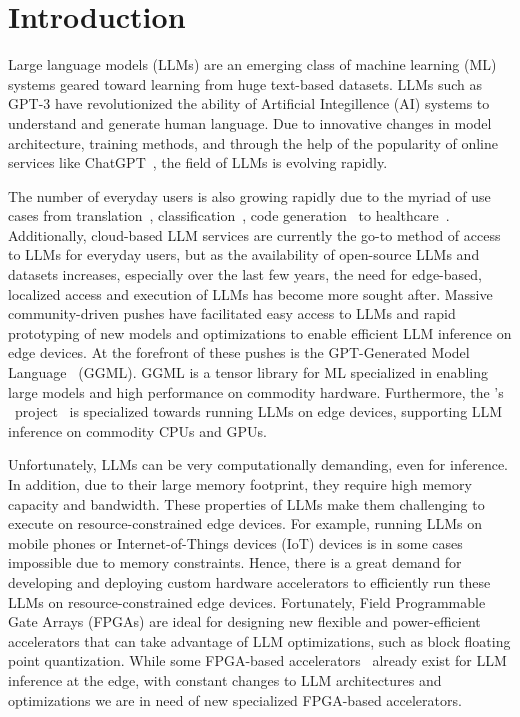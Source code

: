 
\section{Introduction}

Large language models (LLMs) are an emerging class of machine learning (ML) systems geared toward learning from huge text-based datasets.
LLMs such as GPT-3\cite{brownLanguageModelsAre2020} have revolutionized the ability of Artificial Integillence (AI) systems to understand and generate human language.
Due to innovative changes in model architecture, training methods, and through the help of the popularity of online services like ChatGPT~\cite{rayChatGPTComprehensiveReview2023}, the field of LLMs is evolving rapidly.

The number of everyday users is also growing rapidly due to the myriad of use cases from translation~\cite{yaoBenchmarkingLLMbasedMachine2024}, classification~\cite{sunTextClassificationLarge2023}, code generation~\cite{liuYourCodeGenerated2023} to healthcare~\cite{clusmannFutureLandscapeLarge2023}.
Additionally, cloud-based LLM services are currently the go-to method of access to LLMs for everyday users, but as the availability of open-source LLMs and datasets increases, especially over the last few years, the need for edge-based, localized access and execution of LLMs has become more sought after.
Massive community-driven pushes have facilitated easy access to LLMs and rapid prototyping of new models and optimizations to enable efficient LLM inference on edge devices.
At the forefront of these pushes is the GPT-Generated Model Language~\cite{GGML} (GGML).
GGML is a tensor library for ML specialized in enabling large models and high performance on commodity hardware.
Furthermore, the \GGML's \LPP~project~\cite{LLP} is specialized towards running LLMs on edge devices, supporting LLM inference on commodity CPUs and GPUs.

Unfortunately, LLMs can be very computationally demanding, even for inference.
In addition, due to their large memory footprint, they require high memory capacity and bandwidth.
These properties of LLMs make them challenging to execute on resource-constrained edge devices.
For example, running LLMs on mobile phones or Internet-of-Things devices (IoT) devices is in some cases impossible due to memory constraints.
Hence, there is a great demand for developing and deploying custom hardware accelerators to efficiently run these LLMs on resource-constrained edge devices.
Fortunately, Field Programmable Gate Arrays (FPGAs) are ideal for designing new flexible and power-efficient accelerators that can take advantage of LLM optimizations, such as block floating point quantization.
While some FPGA-based accelerators~\cite{Khan2021NPE,Lu2020Transformer} already exist for LLM inference at the edge, with constant changes to LLM architectures and optimizations we are in need of new specialized FPGA-based accelerators.

